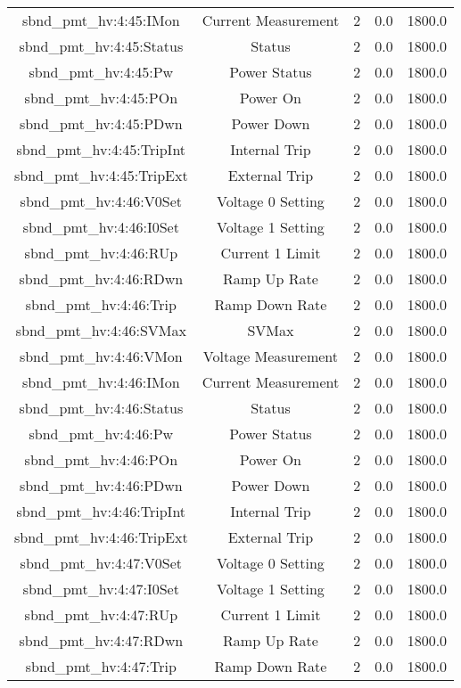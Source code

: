 \begin{table}[ptb]
\begin{tabular}{c | c c c c}
sbnd_pmt_hv:4:45:IMon & Current Measurement & 2 & 0.0 & 1800.0\\ 
sbnd_pmt_hv:4:45:Status & Status & 2 & 0.0 & 1800.0\\ 
sbnd_pmt_hv:4:45:Pw & Power Status & 2 & 0.0 & 1800.0\\ 
sbnd_pmt_hv:4:45:POn & Power On & 2 & 0.0 & 1800.0\\ 
sbnd_pmt_hv:4:45:PDwn & Power Down & 2 & 0.0 & 1800.0\\ 
sbnd_pmt_hv:4:45:TripInt & Internal Trip & 2 & 0.0 & 1800.0\\ 
sbnd_pmt_hv:4:45:TripExt & External Trip & 2 & 0.0 & 1800.0\\ 
sbnd_pmt_hv:4:46:V0Set & Voltage 0 Setting & 2 & 0.0 & 1800.0\\ 
sbnd_pmt_hv:4:46:I0Set & Voltage 1 Setting & 2 & 0.0 & 1800.0\\ 
sbnd_pmt_hv:4:46:RUp & Current 1 Limit & 2 & 0.0 & 1800.0\\ 
sbnd_pmt_hv:4:46:RDwn & Ramp Up Rate & 2 & 0.0 & 1800.0\\ 
sbnd_pmt_hv:4:46:Trip & Ramp Down Rate & 2 & 0.0 & 1800.0\\ 
sbnd_pmt_hv:4:46:SVMax & SVMax & 2 & 0.0 & 1800.0\\ 
sbnd_pmt_hv:4:46:VMon & Voltage Measurement & 2 & 0.0 & 1800.0\\ 
sbnd_pmt_hv:4:46:IMon & Current Measurement & 2 & 0.0 & 1800.0\\ 
sbnd_pmt_hv:4:46:Status & Status & 2 & 0.0 & 1800.0\\ 
sbnd_pmt_hv:4:46:Pw & Power Status & 2 & 0.0 & 1800.0\\ 
sbnd_pmt_hv:4:46:POn & Power On & 2 & 0.0 & 1800.0\\ 
sbnd_pmt_hv:4:46:PDwn & Power Down & 2 & 0.0 & 1800.0\\ 
sbnd_pmt_hv:4:46:TripInt & Internal Trip & 2 & 0.0 & 1800.0\\ 
sbnd_pmt_hv:4:46:TripExt & External Trip & 2 & 0.0 & 1800.0\\ 
sbnd_pmt_hv:4:47:V0Set & Voltage 0 Setting & 2 & 0.0 & 1800.0\\ 
sbnd_pmt_hv:4:47:I0Set & Voltage 1 Setting & 2 & 0.0 & 1800.0\\ 
sbnd_pmt_hv:4:47:RUp & Current 1 Limit & 2 & 0.0 & 1800.0\\ 
sbnd_pmt_hv:4:47:RDwn & Ramp Up Rate & 2 & 0.0 & 1800.0\\ 
sbnd_pmt_hv:4:47:Trip & Ramp Down Rate & 2 & 0.0 & 1800.0\\ 

\end{tabular}
\end{table}
